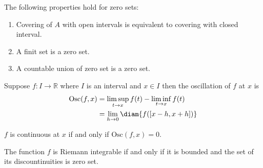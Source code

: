 \begin{proposition}
    The following properties hold for zero sets:
    \begin{enumerate}
        \item
              Covering of \(A\) with open intervals is equivalent to covering with closed interval.
        \item
              A finit set is a zero set.
        \item
              A countable union of zero set is a zero set.
    \end{enumerate}
\end{proposition}
\begin{definition}[Oscillation]
    Suppose \(f : I \to \mathbb{R}\) where \(I\) is an interval and \(x \in I\) then the oscillation of \(f\) at \(x\) is
    \begin{align*}
        \text{Osc}(f,x) & =\limsup\limits_{t \to x} f(t) - \liminf\limits_{t \to x} f(t) \\
                        & = \lim\limits_{h \to 0} \diam{f([x-h,x+h])}
    \end{align*}
\end{definition}
\begin{proposition}
    \(f\) is continuous at \(x\) if and only if \(\text{Osc}(f,x) = 0\).
\end{proposition}
\begin{theorem}
    The function \(f\) is Riemann integrable if and only if it is bounded and the set of its discountinuities is zero set.
\end{theorem}
